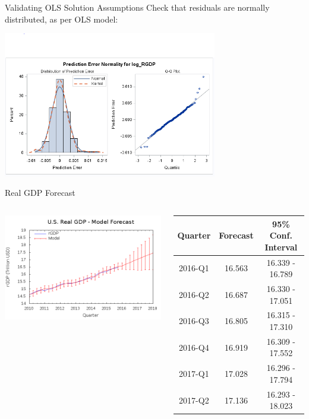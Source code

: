 \begin{frame}{Validating OLS Solution Assumptions}
    Check that residuals are normally distributed, as per OLS model:
    \begin{center}
        \includegraphics[width=0.7\textwidth]{../img/model1-errornormality.png}
    \end{center}
\end{frame}

\begin{frame}{Real GDP Forecast}

\begin{columns}[c]
        \includegraphics[width=\textwidth]{../img/model1-rgdp-forecast.png}
        \begin{table}
        \tiny
        \centering
        \begin{tabular}{c c c} 
            \bf{Quarter} & \bf{Forecast} & \bf{95\% Conf. Interval} \\ \hline
            2016-Q1 & 16.563 & 16.339 - 16.789 \\
            2016-Q2 & 16.687 & 16.330 - 17.051 \\
            2016-Q3 & 16.805 & 16.315 - 17.310 \\
            2016-Q4 & 16.919 & 16.309 - 17.552 \\
            2017-Q1 & 17.028 & 16.296 - 17.794 \\
            2017-Q2 & 17.136 & 16.293 - 18.023 \\
        \end{tabular}
        \end{table}
    \end{columns}
\end{frame}